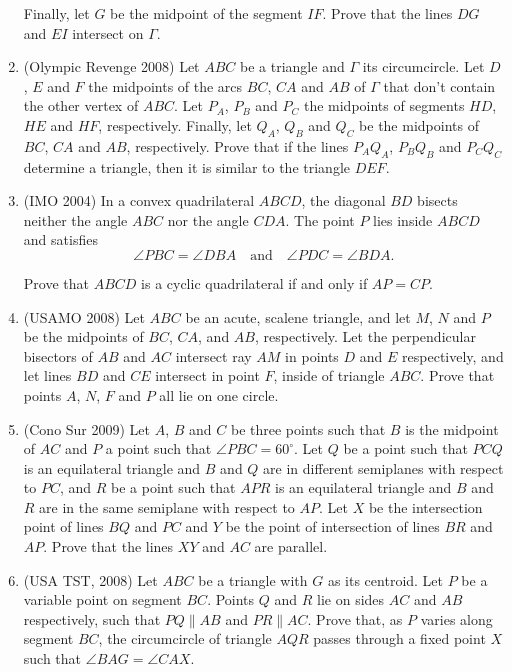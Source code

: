 \documentclass[10pt]{article}
\theoremstyle{definition}
\theoremstyle{remark}
\begin{document}
\begin{enumerate}
Finally, let $G$ be the midpoint of the segment $IF$. Prove that the lines $DG$ and $EI$ intersect on $\Gamma$.

\item (Olympic Revenge 2008) Let $ABC$ be a triangle and $\Gamma$ its circumcircle. Let $D$, $E$ and $F$ the midpoints of the arcs $BC$, $CA$ and $AB$ of $\Gamma$ that don't contain the other vertex of $ABC$. Let $P_A$, $P_B$ and $P_C$ the midpoints of segments $HD$, $HE$ and $HF$, respectively. Finally, let $Q_A$, $Q_B$ and $Q_C$ be the midpoints of $BC$, $CA$ and $AB$, respectively. Prove that if the lines $P_AQ_A$, $P_BQ_B$ and $P_CQ_C$ determine a triangle, then it is similar to the triangle $DEF$.

\item (IMO 2004) In a convex quadrilateral $ABCD$, the diagonal $BD$ bisects neither the angle $ABC$ nor the angle $CDA$. The point $P$ lies inside $ABCD$ and satisfies
$$\angle PBC=\angle DBA\quad\text{and}\quad \angle PDC=\angle BDA.$$

Prove that $ABCD$ is a cyclic quadrilateral if and only if $AP=CP$.

\item (USAMO 2008) Let $ABC$ be an acute, scalene triangle, and let $M$, $N$ and $P$ be the midpoints of $BC$, $CA$, and $AB$, respectively. Let the perpendicular bisectors of $AB$ and $AC$ intersect ray $AM$ in points $D$ and $E$ respectively, and let lines $BD$ and $CE$ intersect in point $F$, inside of triangle $ABC$. Prove that points $A$, $N$, $F$ and $P$ all lie on one circle. 

\item (Cono Sur 2009) Let $A$, $B$ and $C$ be three points such that $B$ is the midpoint of $AC$ and $P$ a point such that $\angle PBC = 60^\circ$. Let $Q$ be a point such that $PCQ$ is an equilateral triangle and $B$ and $Q$ are in different semiplanes with respect to $PC$, and $R$ be a point such that $APR$ is an equilateral triangle and $B$ and $R$ are in the same semiplane with respect to $AP$. Let $X$ be the intersection point of lines $BQ$ and $PC$ and $Y$ be the point of intersection of lines $BR$ and $AP$. Prove that the lines $XY$ and $AC$ are parallel.

\item (USA TST, 2008) Let $ABC$ be a triangle with $G$ as its centroid. Let $P$ be a variable point on segment $BC$. Points $Q$ and $R$ lie on sides $AC$ and $AB$ respectively, such that $PQ \parallel AB$ and $PR \parallel AC$. Prove that, as $P$ varies along segment $BC$, the circumcircle of triangle $AQR$ passes through a fixed point $X$ such that $\angle BAG = \angle CAX$.


\end{enumerate}
\end{document}
